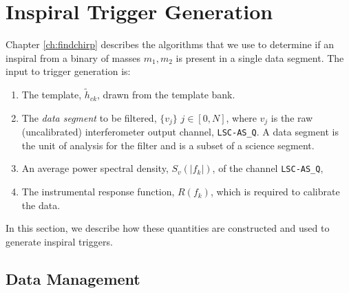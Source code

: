 \section{Inspiral Trigger Generation}
\label{s:pipetemplate}

Chapter \ref{ch:findchirp} describes the algorithms that we use to determine
if an inspiral from a binary of masses ${m_1,m_2}$ is present in a single data
segment. The input to trigger generation is:
\begin{enumerate}
\item The template, $\tilde{h}_{ck}$, drawn from the template bank.

\item The \emph{data segment} to be filtered, $\{v_j\}$ $j \in [0,N]$, where
$v_j$ is the raw (uncalibrated) interferometer output channel,
\texttt{LSC-AS\_Q}. A data segment is the unit of analysis for the filter and
is a subset of a science segment.

\item An average power spectral density, $S_v(|f_k|)$, of the channel 
\texttt{LSC-AS\_Q},

\item The instrumental response function, $R(f_k)$, which is required to
calibrate the data. 
\end{enumerate}
In this section, we describe how these quantities are constructed and used to
generate inspiral triggers.

\subsection{Data Management}
\label{ss:datamanagement}

